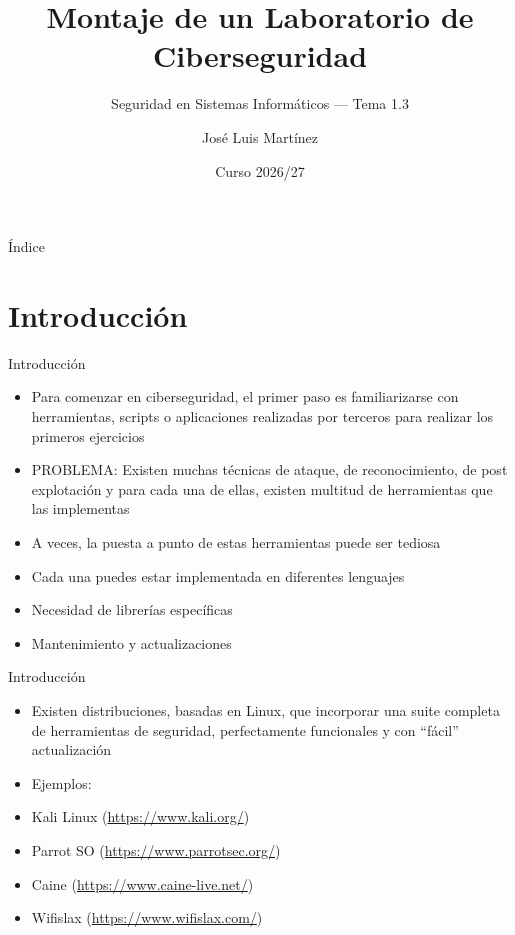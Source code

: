 \documentclass[aspectratio=169,11pt]{beamer}
\title[SSI -- Tema 1.3]{Montaje de un Laboratorio de Ciberseguridad}
\subtitle{Seguridad en Sistemas Informáticos --- Tema 1.3}
\author{José Luis Martínez}
\institute{Universidad de Castilla-La Mancha}
\date{Curso 2026/27}
\begin{document}
\begin{frame}[plain]\titlepage\end{frame}

\begin{frame}{Índice}
\small
\tableofcontents
\end{frame}

\section{Introducción}

\begin{frame}[allowframebreaks]{Introducción}
\small
  \begin{itemize}
  \item Para comenzar en ciberseguridad, el primer paso es familiarizarse con herramientas, scripts o aplicaciones realizadas por terceros para realizar los primeros ejercicios
  \item PROBLEMA: Existen muchas técnicas de ataque, de reconocimiento, de post explotación y para cada una de ellas, existen multitud de herramientas que las implementas
  \item A veces, la puesta a punto de estas herramientas puede ser tediosa
  \item Cada una puedes estar implementada en diferentes lenguajes
  \item Necesidad de librerías específicas
  \item Mantenimiento y actualizaciones
  \end{itemize}
\end{frame}

\begin{frame}[allowframebreaks]{Introducción}
\small
  \begin{itemize}
  \item Existen distribuciones, basadas en Linux, que incorporar una suite completa de herramientas de seguridad, perfectamente funcionales y con ``fácil'' actualización
  \item Ejemplos:
  \item Kali Linux (\href{https://www.kali.org/}{https://www.kali.org/})
  \item Parrot SO (\href{https://www.parrotsec.org/}{https://www.parrotsec.org/})
  \item Caine (\href{https://www.caine-live.net/}{https://www.caine-live.net/})
  \item Wifislax (\href{https://www.wifislax.com/}{https://www.wifislax.com/})
  \end{itemize}
\end{frame}
\end{document}
